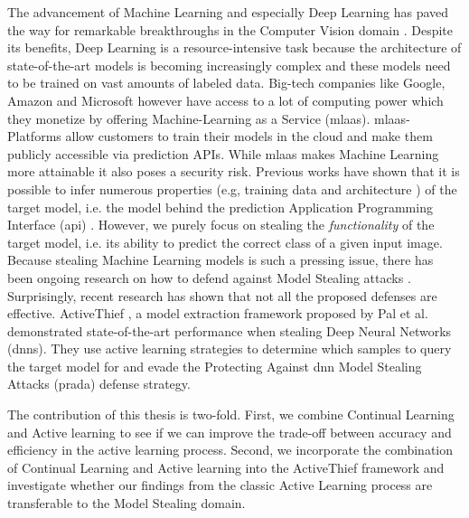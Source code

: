 \Abstract
The advancement of Machine Learning and especially Deep Learning has paved the way for remarkable breakthroughs in the Computer Vision domain \cite{he2016deep}
\cite{goodfellow2020generative} \cite{lecun1989backpropagation}. Despite its benefits, Deep Learning is a resource-intensive task because the architecture
of state-of-the-art models is becoming increasingly complex and these models need to be trained on vast amounts of labeled data. Big-tech companies like Google,
Amazon and Microsoft however have access to a lot of computing power which they monetize by offering Machine-Learning as a Service (\gls{mlaas}). \gls{mlaas}-
Platforms allow customers to train their models in the cloud and make them publicly accessible via prediction APIs. While \gls{mlaas} makes Machine Learning more
attainable it also poses a security risk. Previous works have shown that it is possible to infer numerous properties (e.g, training data \cite{shokri2017membership}
and architecture \cite{oh2019towards}) of the target model, i.e. the model behind the prediction Application Programming Interface (\gls{api}) \cite{tramer2016stealing}
\cite{papernot2017practical}. However, we purely focus on stealing the \textit{functionality} of the target model, i.e. its ability to predict the correct class
of a given input image. Because stealing Machine Learning models is such a pressing issue, there has been ongoing research on how to defend against Model Stealing
attacks \cite{orekondy2019prediction} \cite{juuti2019prada}. Surprisingly, recent research has shown that not all the proposed defenses are effective.
ActiveThief \cite{pal2020activethief}, a model extraction framework proposed by Pal et al. demonstrated state-of-the-art performance when stealing Deep Neural
Networks (\glspl{dnn}). They use active learning strategies to determine which samples to query the target model for and evade the Protecting Against \gls{dnn} Model
Stealing Attacks (\gls{prada})\cite{juuti2019prada} defense strategy. \par
The contribution of this thesis is two-fold. First, we combine Continual Learning and Active learning to see if we can improve the trade-off between accuracy and 
efficiency in the active learning process. Second, we incorporate the combination of Continual Learning and Active learning into the ActiveThief framework and
investigate whether our findings from the classic Active Learning process are transferable to the Model Stealing domain.
